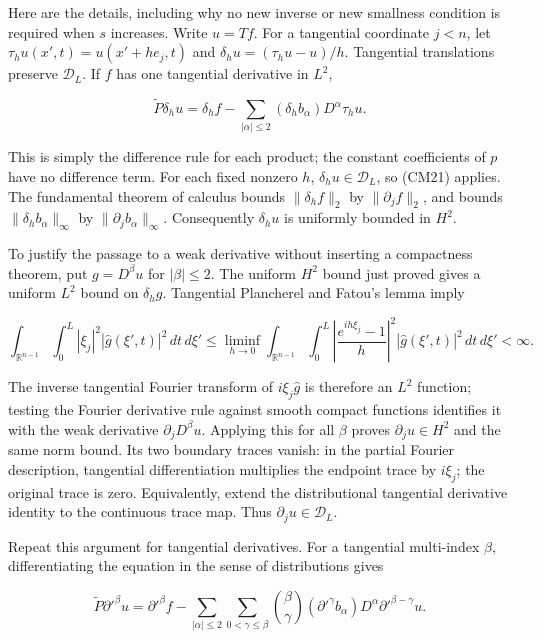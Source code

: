 \documentclass[
  11pt,
]{article}
\begin{document}
Here are the details, including why no new inverse or new smallness
condition is required when \(s\) increases. Write \(u=Tf\). For a
tangential coordinate \(j<n\), let \(\tau_hu(x',t)=u(x'+he_j,t)\) and
\(\delta_hu=(\tau_hu-u)/h\). Tangential translations preserve
\(\mathcal D_L\). If \(f\) has one tangential derivative in \(L^2\),

\[
\widetilde P\delta_hu
=\delta_hf-\sum_{|\alpha|\leq2}(\delta_h b_\alpha)D^\alpha\tau_hu.
\tag{CM24}
\]

This is simply the difference rule for each product; the constant
coefficients of \(p\) have no difference term. For each fixed nonzero
\(h\), \(\delta_hu\in\mathcal D_L\), so (CM21) applies. The fundamental
theorem of calculus bounds \(\|\delta_hf\|_2\) by \(\|\partial_jf\|_2\),
and bounds \(\|\delta_hb_\alpha\|_\infty\) by
\(\|\partial_jb_\alpha\|_\infty\). Consequently \(\delta_hu\) is
uniformly bounded in \(H^2\).

To justify the passage to a weak derivative without inserting a
compactness theorem, put \(g=D^\beta u\) for \(|\beta|\leq2\). The
uniform \(H^2\) bound just proved gives a uniform \(L^2\) bound on
\(\delta_hg\). Tangential Plancherel and Fatou's lemma imply

\[
\int_{\mathbb R^{n-1}}\int_0^L
|\xi_j|^2|\widehat g(\xi',t)|^2\,dt\,d\xi'
\leq\liminf_{h\to0}
\int_{\mathbb R^{n-1}}\int_0^L
\left|\frac{e^{ih\xi_j}-1}{h}\right|^2
|\widehat g(\xi',t)|^2\,dt\,d\xi'<\infty.
\]

The inverse tangential Fourier transform of \(i\xi_j\widehat g\) is
therefore an \(L^2\) function; testing the Fourier derivative rule
against smooth compact functions identifies it with the weak derivative
\(\partial_jD^\beta u\). Applying this for all \(\beta\) proves
\(\partial_ju\in H^2\) and the same norm bound. Its two boundary traces
vanish: in the partial Fourier description, tangential differentiation
multiplies the endpoint trace by \(i\xi_j\); the original trace is zero.
Equivalently, extend the distributional tangential derivative identity
to the continuous trace map. Thus \(\partial_ju\in\mathcal D_L\).

Repeat this argument for tangential derivatives. For a tangential
multi-index \(\beta\), differentiating the equation in the sense of
distributions gives

\[
\widetilde P\partial'^\beta u
=\partial'^\beta f
-\sum_{|\alpha|\leq2}\sum_{0<\gamma\leq\beta}
\binom\beta\gamma
(\partial'^\gamma b_\alpha)D^\alpha\partial'^{\beta-\gamma}u.
\tag{CM25}
\]
\end{document}

